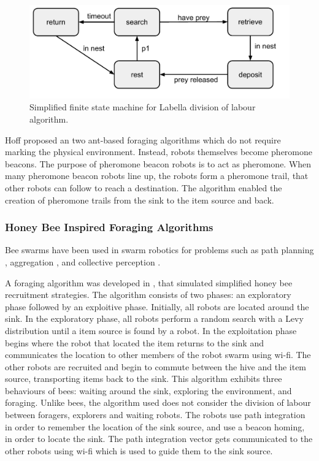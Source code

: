 \begin{figure}
\includegraphics[width=\textwidth]{chapters/chapter2/figures/LabellaFSM.pdf}
\caption{Simplified finite state machine for Labella division of labour algorithm. }
\end{figure} 

Hoff \cite{hoff2010two} proposed an two ant-based foraging algorithms which do not require marking the physical environment. Instead, robots themselves become pheromone beacons. The purpose of pheromone beacon robots is to act as pheromone. When many pheromone beacon robots line up, the robots form a pheromone trail, that other robots can follow to reach a destination. The algorithm enabled the creation of pheromone trails from the sink to the item source and back.

\subsubsection{Honey Bee Inspired Foraging Algorithms}
Bee swarms have been used in swarm robotics for problems such as path planning \cite{lin2009chaotic}, aggregation \cite{kernbach2009re}, and collective perception \cite{schmickl2007collective}. 

A foraging algorithm was developed in \cite{alers2014biologically}, that simulated simplified honey bee recruitment strategies. The algorithm consists of two phases: an exploratory phase followed by an exploitive phase. Initially, all robots are located around the sink. In the exploratory phase, all robots perform a random search with a Levy distribution until a item source is found by a robot. In the exploitation phase begins where the robot that located the item returns to the sink and communicates the location to other members of the robot swarm using wi-fi. The other robots are recruited and begin to commute between the hive and the item source, transporting items back to the sink. This algorithm exhibits three behaviours of bees: waiting around the sink, exploring the environment, and foraging. Unlike bees, the algorithm used does not consider the division of labour between foragers, explorers and waiting robots. The robots use path integration in order to remember the location of the sink source, and use a beacon homing, in order to locate the sink. The path integration vector gets communicated to the other robots using wi-fi which is used to guide them to the sink source. 

